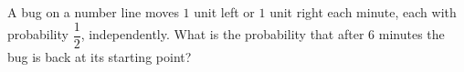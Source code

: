 A bug on a number line moves $1$ unit left or $1$ unit right each minute, each with probability $\dfrac{1}{2}$, independently. What is the probability that after $6$ minutes the bug is back at its starting point?
